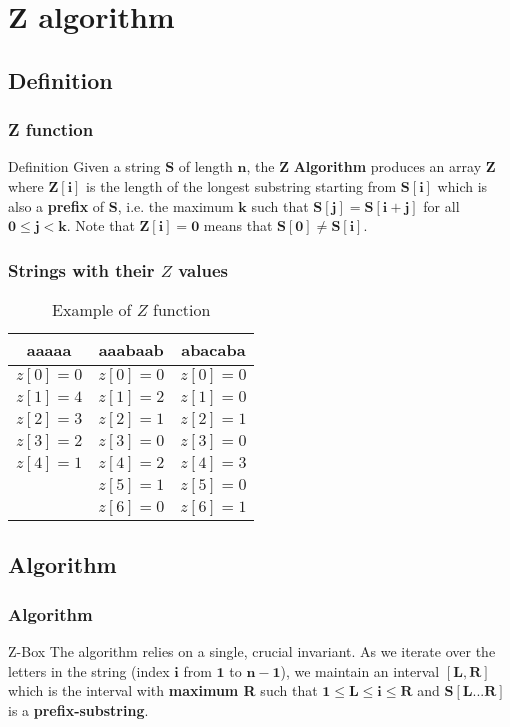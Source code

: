 \documentclass{beamer}
\begin{document}
\section{Z algorithm}
\subsection{Definition}
\begin{frame}
\frametitle{Z function}
\begin{block}{Definition}
Given a string $\mathbf{S}$ of length $\mathbf{n}$, the $\mathbf{Z}$ \textbf{Algorithm} produces an array $\mathbf{Z}$ where $\mathbf{Z[i]}$ is the length of the longest substring starting from $\mathbf{S[i]}$ which is also a \textbf{prefix} of $\mathbf{S}$, i.e. the maximum $\mathbf{k}$ such that $\mathbf{S[j] = S[i + j]}$ for all $\mathbf{0 \le j < k}$. Note that $\mathbf{Z[i] = 0}$ means that $\mathbf{S[0] \ne S[i]}$. 
\end{block}
\end{frame}
\begin{frame}
\frametitle{Strings with their $Z$ values}
\begin{table}
\begin{tabular}{|c|c|c|}
\toprule
\textbf{aaaaa} & \textbf{aaabaab} & \textbf{abacaba}\\
\midrule
$z[0]=0$ & $z[0]=0$ & $z[0]=0$ \\
$z[1]=4$ & $z[1]=2$ & $z[1]=0$ \\
$z[2]=3$ & $z[2]=1$ & $z[2]=1$ \\
$z[3]=2$ & $z[3]=0$ & $z[3]=0$ \\
$z[4]=1$ & $z[4]=2$ & $z[4]=3$ \\
         & $z[5]=1$ & $z[5]=0$ \\
         & $z[6]=0$ & $z[6]=1$ \\

\bottomrule
\end{tabular}
\caption{Example of $Z$ function}
\end{table}
\end{frame}

\subsection{Algorithm}

\begin{frame}
\frametitle{Algorithm}
\begin{block}{Z-Box}
The algorithm relies on a single, crucial invariant. As we iterate over the letters in the string (index $\mathbf{i}$ from $\mathbf{1}$ to $\mathbf{n-1}$), we maintain an interval $\mathbf{[L, R]}$ which is the interval with \textbf{maximum R} such that $\mathbf{1 \le L \le i \le R}$ and $\mathbf{S[L...R]}$ is a \textbf{prefix-substring}.
\end{block} 
\end{frame}
\end{document}
